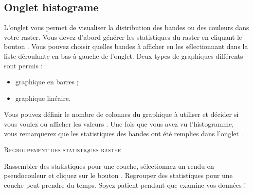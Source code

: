 \subsection{Onglet histograme}\label{label_histogram}

L'onglet   vous permet de visualiser la distribution
 des bandes ou des couleurs dans votre raster. Vous devez d'abord générer les statistiques du raster en cliquant le bouton . Vous pouvez choisir quelles bandes à afficher en les sélectionnant dans la liste déroulante en bas à gauche de l'onglet. Deux types de graphiques différents sont permis :

\begin{itemize}[label=--]
\item graphique en barres ;
\item graphique linéaire.
\end{itemize}

Vous pouvez définir le nombre de colonnes du graphique à utiliser et décider si vous voulez  ou afficher les valeurs . Une fois que vous avez vu l'histogramme, vous remarquerez que les statistiques des bandes ont été remplies dans l'onglet .

\begin{Tip}\caption{\textsc{Regroupement des statistiques raster}}
Rassembler des statistiques pour une couche, sélectionnez un rendu en pseudocouleur et cliquez sur le bouton . Regrouper des statistiques pour une couche peut prendre du temps. Soyez patient pendant que \qg examine  vos données !
\end{Tip}

